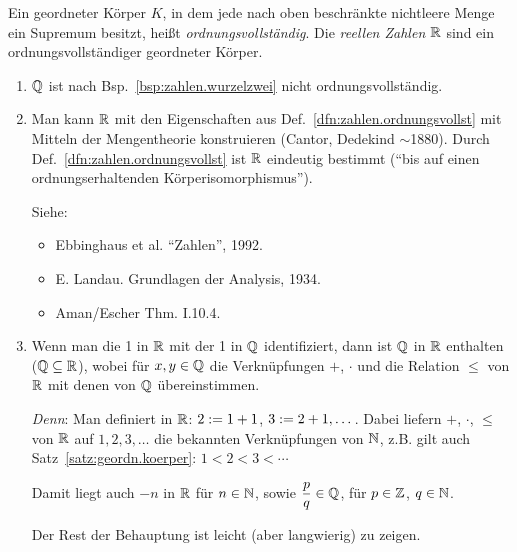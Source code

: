 \documentclass[12pt]{scrreprt}
\begin{document}
\begin{dfn}\label{dfn:zahlen.ordnungsvollst}
Ein geordneter Körper $K$, in dem jede nach oben beschränkte nichtleere Menge ein Supremum besitzt, heißt \emph{ordnungsvollständig}. Die \emph{reellen Zahlen $\mathbb{R}$} sind ein ordnungsvollständiger geordneter Körper.

\begin{bem*}
\begin{enumerate}%
\item $\mathbb{Q}$ ist nach Bsp.~\ref{bsp:zahlen.wurzelzwei} nicht ordnungsvollständig.

\item Man kann $\mathbb{R}$ mit den Eigenschaften aus Def.~\ref{dfn:zahlen.ordnungsvollst} mit Mitteln der Mengentheorie konstruieren (Cantor, Dedekind $\sim$1880). Durch Def.~\ref{dfn:zahlen.ordnungsvollst} ist $\mathbb{R}$ eindeutig bestimmt ("`bis auf einen ordnungserhaltenden Körperisomorphismus"').

Siehe:\begin{itemize}\item Ebbinghaus et al. "`Zahlen"', 1992.
\item E. Landau. Grundlagen der Analysis, 1934.
\item Aman/Escher Thm. I.10.4.
\end{itemize}

\item Wenn man die 1 in $\mathbb{R}$ mit der 1 in $\mathbb{Q}$ identifiziert, dann ist $\mathbb{Q}$ in $\mathbb{R}$ enthalten ($\mathbb{Q} \subseteq \mathbb{R}$), wobei für $x,y\in\mathbb{Q}$ die Verknüpfungen $+$, $\cdot$ und die Relation $\leq$ von $\mathbb{R}$ mit denen von $\mathbb{Q}$ übereinstimmen.

\emph{Denn}: Man definiert in $\mathbb{R}$: $2:= 1+1$, $3:= 2+1, \dotsc$. Dabei liefern $+$, $\cdot$, $\leq$ von $\mathbb{R}$ auf $1,2,3,\dotsc$ die bekannten Verknüpfungen von $\mathbb{N}$, z.B. gilt auch Satz~\ref{satz:geordn.koerper}: $1<2<3<\dotsb$

Damit liegt auch $-n$ in $\mathbb{R}$ für $n\in\mathbb{N}$, sowie $\displaystyle\frac{p}{q}\in\mathbb{Q}$, für $p\in\mathbb{Z}$, $q\in\mathbb{N}$.

Der Rest der Behauptung ist leicht (aber langwierig) zu zeigen.
\end{enumerate}
\end{bem*}
\end{dfn}

\end{document}

